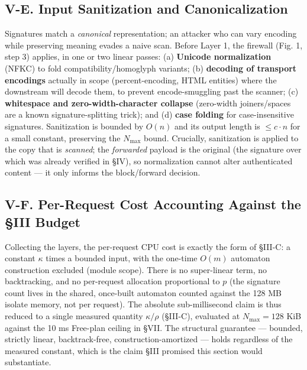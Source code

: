 \subsection{V-E. Input Sanitization and
Canonicalization}\label{v-e-input-sanitization-and-canonicalization}

Signatures match a \emph{canonical} representation; an attacker who can
vary encoding while preserving meaning evades a naive scan. Before Layer
1, the firewall (Fig. 1, step 3) applies, in one or two linear passes:
(a) \textbf{Unicode normalization} (NFKC) to fold
compatibility/homoglyph variants; (b) \textbf{decoding of transport
encodings} actually in scope (percent-encoding, HTML entities) where the
downstream will decode them, to prevent encode-smuggling past the
scanner; (c) \textbf{whitespace and zero-width-character collapse}
(zero-width joiners/spaces are a known signature-splitting trick); and
(d) \textbf{case folding} for case-insensitive signatures. Sanitization
is bounded by \(O(n)\) and its output length is \(\le c\cdot n\) for a
small constant, preserving the \(N_{\max}\) bound. Crucially,
sanitization is applied to the copy that is \emph{scanned}; the
\emph{forwarded} payload is the original (the signature over which was
already verified in §IV), so normalization cannot alter authenticated
content --- it only informs the block/forward decision.

\subsection{V-F. Per-Request Cost Accounting Against the §III
Budget}\label{v-f-per-request-cost-accounting-against-the-iii-budget}

Collecting the layers, the per-request CPU cost is
exactly the form of §III-C: a constant \(\kappa\) times a bounded input,
with the one-time \(O(m)\) automaton construction excluded (module
scope). There is no super-linear term, no backtracking, and no
per-request allocation proportional to \(p\) (the signature count lives
in the shared, once-built automaton counted against the 128 MB isolate
memory, not per request). The absolute sub-millisecond claim is thus
reduced to a single measured quantity \(\kappa/\rho\) (§III-C),
evaluated at \(N_{\max}=128\) KiB against the 10 ms Free-plan ceiling in
§VII. The structural guarantee --- bounded, strictly linear,
backtrack-free, construction-amortized --- holds regardless of the
measured constant, which is the claim §III promised this section would
substantiate.

